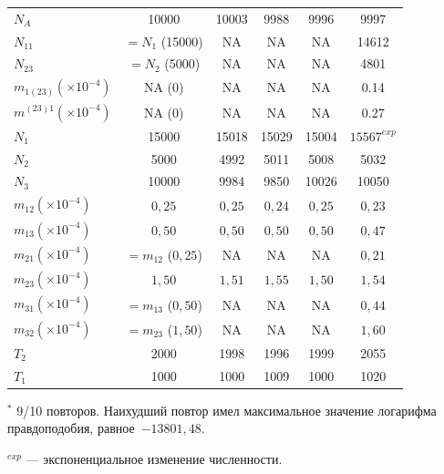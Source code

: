 \begin{table}[ht!]
{\begin{tabular}{|l | c | c c c | c|}
    \hline
    $N_A$ & 10000 & 10003 & 9988 & 9996  & 9997\\
    $N_{11}$ & $=N_1$ (15000) & NA & NA & NA & 14612\\
    $N_{23}$ & $=N_2$ (5000) & NA & NA & NA & 4801\\
    $m_{1(23)} (\times 10^{-4})$ & NA (0) & NA & NA & NA & 0.14 \\
    $m^{(23)1} (\times 10^{-4})$ & NA (0) & NA & NA & NA & 0.27\\
    $N_1$ & 15000 & 15018 & 15029 & 15004 & $15567^{exp}$\\
    $N_2$ & 5000 & 4992 & 5011 & 5008 & 5032\\
    $N_3$ & 10000 & 9984 & 9850 & 10026 & 10050\\
    $m_{12} (\times 10^{-4})$ & $0{,}25$ & $0{,}25$ & $0{,}24$ & $0{,}25$ & $0{,}23$\\
    $m_{13} (\times 10^{-4})$ & $0{,}50$ & $0{,}50$ & $0{,}50$ & $0{,}50$ &  $0{,}47$\\
    $m_{21} (\times 10^{-4})$ & $=m_{12}$ ($0{,}25$) & NA & NA & NA & $0{,}21$\\
    $m_{23} (\times 10^{-4})$ & $1{,}50$ & $1{,}51$ & $1{,}55$ & $1{,}50$ &  $1{,}54$\\
    $m_{31} (\times 10^{-4})$ & $=m_{13}$ ($0{,}50$) & NA & NA & NA & $0{,}44$ \\
    $m_{32} (\times 10^{-4})$ & $=m_{23}$ ($1{,}50$) & NA & NA & NA & $1{,}60$ \\
    $T_2$ & 2000 & 1998 & 1996 & 1999 & 2055\\
    $T_1$ & 1000 & 1000 & 1009 & 1000 & 1020\\
    \hline
    \end{tabular}%
    }
    \begin{tablenotes}
      \footnotesize
      \item $^*$ 9/10 повторов. Наихудший повтор имел максимальное значение логарифма правдоподобия, равное~$-13801{,}48$.\\
      \item $^{exp}$ --- экспоненциальное изменение численности.
    \end{tablenotes}
    \label{tab:part2:experiments:simulated_3:results}
\end{table}

